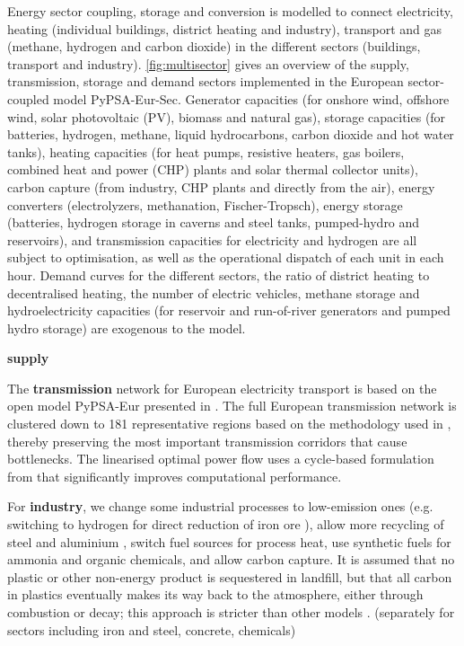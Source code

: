 Energy sector coupling, storage and conversion is modelled to connect
electricity, heating (individual buildings, district heating and industry),
transport and gas (methane, hydrogen and carbon dioxide) in the different
sectors (buildings, transport and industry). \cref{fig:multisector} gives an
overview of the supply, transmission, storage and demand sectors implemented in
the European sector-coupled model PyPSA-Eur-Sec. Generator capacities (for
onshore wind, offshore wind, solar photovoltaic (PV), biomass and natural gas),
storage capacities (for batteries, hydrogen, methane, liquid hydrocarbons,
carbon dioxide and hot water tanks), heating capacities (for heat pumps,
resistive heaters, gas boilers, combined heat and power (CHP) plants and solar
thermal collector units), carbon capture (from industry, CHP plants and directly
from the air), energy converters (electrolyzers, methanation, Fischer-Tropsch),
energy storage (batteries, hydrogen storage in caverns and steel tanks,
pumped-hydro and reservoirs), and transmission capacities for electricity and
hydrogen are all subject to optimisation, as well as the operational dispatch of
each unit in each hour. Demand curves for the different sectors, the ratio of
district heating to decentralised heating, the number of electric vehicles,
methane storage and hydroelectricity capacities (for reservoir and run-of-river
generators and pumped hydro storage) are exogenous to the model.

\textbf{supply}

The \textbf{transmission} network for European electricity transport is based on
the open model PyPSA-Eur presented in \cite{horschPyPSAEurOpen2018}. The full
European transmission network is clustered down to 181 representative regions
based on the methodology used in \cite{Hoersch2017,frysztackiStrongEffect2021},
thereby preserving the most important transmission corridors that cause
bottlenecks. The linearised optimal power flow uses a cycle-based formulation
from \cite{horschLinearOptimal2018} that significantly improves computational
performance.

For \textbf{industry}, we change some industrial processes to low-emission ones (e.g.
switching to hydrogen for direct reduction of iron ore \cite{voglAssessmentHydrogen2018}), allow
more recycling of steel and aluminium \cite{circular_economy}, switch fuel
sources for process heat, use synthetic fuels for ammonia and organic chemicals,
and allow carbon capture. It is assumed that no plastic or other non-energy
product is sequestered in landfill, but that all carbon in plastics eventually
makes its way back to the atmosphere, either through combustion or decay; this
approach is stricter than other models \cite{in-depth_2018}.
(separately for sectors including iron and steel, concrete, chemicals)

